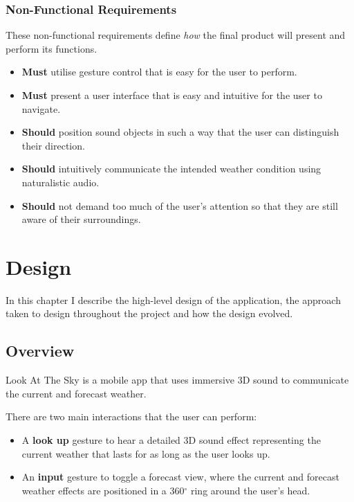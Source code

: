 \documentclass{l4proj}
\begin{document}
\subsection{Non-Functional Requirements}
These non-functional requirements define \emph{how} the final product will present and perform its functions.
\begin{itemize}
    \item \textbf{Must} utilise gesture control that is easy for the user to perform.
    \item \textbf{Must} present a user interface that is easy and intuitive for the user to navigate.
    \item \textbf{Should} position sound objects in such a way that the user can distinguish their direction.
    \item \textbf{Should} intuitively communicate the intended weather condition using naturalistic audio.
    \item \textbf{Should} not demand too much of the user's attention so that they are still aware of their surroundings.
    
\end{itemize}

\chapter{Design}

In this chapter I describe the high-level design of the application, the approach taken to design throughout the project and how the design evolved.

\section{Overview}

Look At The Sky is a mobile app that uses immersive 3D sound to communicate the current and forecast weather.

There are two main interactions that the user can perform:
\begin{itemize}
    \item A \textbf{look up} gesture to hear a detailed 3D sound effect representing the current weather that lasts for as long as the user looks up.
    \item An \textbf{input} gesture to toggle a forecast view, where the current and forecast weather effects are positioned in a 360$^\circ$ ring around the user's head.
\end{itemize}
\end{document}
